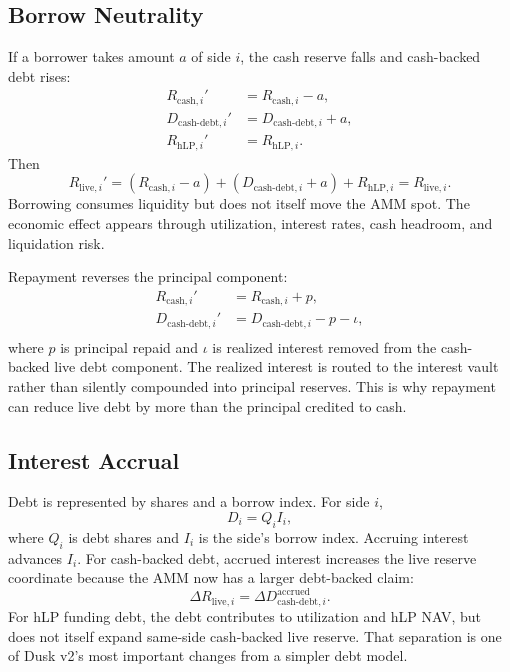 \documentclass[11pt]{article}
\newcommand{\cash}{\mathrm{cash}}
\newcommand{\live}{\mathrm{live}}
\newcommand{\hlp}{\mathrm{hLP}}
\newcommand{\debt}{\mathrm{debt}}
\begin{document}
\subsection{Borrow Neutrality}

If a borrower takes amount $a$ of side $i$, the cash reserve falls and cash-backed debt rises:
\begin{align}
R_{\cash,i}' &= R_{\cash,i}-a,\\
D_{\cash\text{-}\debt,i}' &= D_{\cash\text{-}\debt,i}+a,\\
R_{\hlp,i}' &= R_{\hlp,i}.
\end{align}
Then
\begin{equation}
R_{\live,i}'=(R_{\cash,i}-a)+(D_{\cash\text{-}\debt,i}+a)+R_{\hlp,i}=R_{\live,i}.
\end{equation}
Borrowing consumes liquidity but does not itself move the AMM spot. The economic effect appears through utilization, interest rates, cash headroom, and liquidation risk.

Repayment reverses the principal component:
\begin{align}
R_{\cash,i}' &= R_{\cash,i}+p,\\
D_{\cash\text{-}\debt,i}' &= D_{\cash\text{-}\debt,i}-p-\iota,\\
\end{align}
where $p$ is principal repaid and $\iota$ is realized interest removed from the cash-backed live debt component. The realized interest is routed to the interest vault rather than silently compounded into principal reserves. This is why repayment can reduce live debt by more than the principal credited to cash.

\subsection{Interest Accrual}

Debt is represented by shares and a borrow index. For side $i$,
\begin{equation}
D_i = Q_i I_i,
\end{equation}
where $Q_i$ is debt shares and $I_i$ is the side's borrow index. Accruing interest advances $I_i$. For cash-backed debt, accrued interest increases the live reserve coordinate because the AMM now has a larger debt-backed claim:
\begin{equation}
\Delta R_{\live,i}=\Delta D_{\cash\text{-}\debt,i}^{\mathrm{accrued}}.
\end{equation}
For hLP funding debt, the debt contributes to utilization and hLP NAV, but does not itself expand same-side cash-backed live reserve. That separation is one of Dusk v2's most important changes from a simpler debt model.
\end{document}
